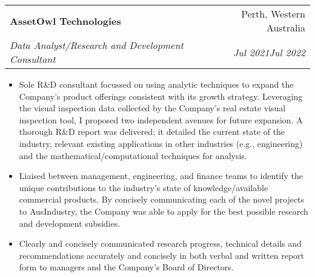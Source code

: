 \documentclass[letterpaper,10.8pt]{article}
\makeatletter
\newcommand{\resumeItem}[2]{
  \item\small{
    \textbf{#1}{#2 \vspace{-2pt}}
  }
}
\newcommand{\resumeSubheading}[4]{
  \vspace{-1pt}\item
    \begin{tabular*}{0.97\textwidth}{l@{\extracolsep{\fill}}r}
      \textbf{#1} & #2 \\
      \textit{\small#3} & \textit{\small #4} \\
    \end{tabular*}\vspace{-5pt}
}
\newcommand{\resumeItemListStart}{\begin{itemize}}
\newcommand{\resumeItemListEnd}{\end{itemize}\vspace{-5pt}}
\makeatother
\begin{document}
    \resumeSubheading
    {AssetOwl Technologies}{Perth, Western Australia}
    {Data Analyst/Research and Development Consultant}{Jul 2021\textendash Jul 2022}
    \resumeItemListStart
        \resumeItem{}{Sole R\&D consultant focussed on using analytic techniques to expand the Company's product offerings consistent with its growth strategy. Leveraging the visual inspection data collected by the Company's real estate visual inspection tool, I proposed two independent avenues for future expansion. A thorough R\&D report was delivered; it detailed the current state of the industry, relevant existing applications in other industries (e.g., engineering) and the mathematical/computational techniques for analysis.}
        \resumeItem{}{Liaised between management, engineering, and finance teams to identify the unique contributions to the industry's state of knowledge/available commercial products. By concisely communicating each of the novel projects to AusIndustry, the Company was able to apply for the best possible research and development subsidies.}
        \resumeItem{}{Clearly and concisely communicated research progress, technical details and recommendations accurately and concisely in both verbal and written report form to managers and the Company's Board of Directors.}
    \resumeItemListEnd
      
\end{document}
